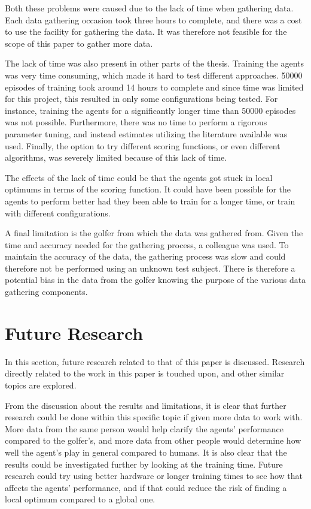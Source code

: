 \documentclass{kththesis}
\begin{document}
Both these problems were caused due to the lack of time when gathering data. Each data gathering occasion took three hours to complete, and there was a cost to use the facility for gathering the data. It was therefore not feasible for the scope of this paper to gather more data.

The lack of time was also present in other parts of the thesis. Training the agents was very time consuming, which made it hard to test different approaches. 50000 episodes of training took around 14 hours to complete and since time was limited for this project, this resulted in only some configurations being tested. For instance, training the agents for a significantly longer time than 50000 episodes was not possible. Furthermore, there was no time to perform a rigorous parameter tuning, and instead estimates utilizing the literature available was used. Finally, the option to try different scoring functions, or even different algorithms, was severely limited because of this lack of time.

The effects of the lack of time could be that the agents got stuck in local optimums in terms of the scoring function. It could have been possible for the agents to perform better had they been able to train for a longer time, or train with different configurations. 

A final limitation is the golfer from which the data was gathered from. Given the time and accuracy needed for the gathering process, a colleague was used. To maintain the accuracy of the data, the gathering process was slow and could therefore not be performed using an unknown test subject. There is therefore a potential bias in the data from the golfer knowing the purpose of the various data gathering components. 

\section{Future Research}
In this section, future research related to that of this paper is discussed. Research directly related to the work in this paper is touched upon, and other similar topics are explored.

From the discussion about the results and limitations, it is clear that further research could be done within this specific topic if given more data to work with. More data from the same person would help clarify the agents' performance compared to the golfer's, and more data from other people would determine how well the agent's play in general compared to humans. It is also clear that the results could be investigated further by looking at the training time. Future research could try using better hardware or longer training times to see how that affects the agents' performance, and if that could reduce the risk of finding a local optimum compared to a global one.
\end{document}
